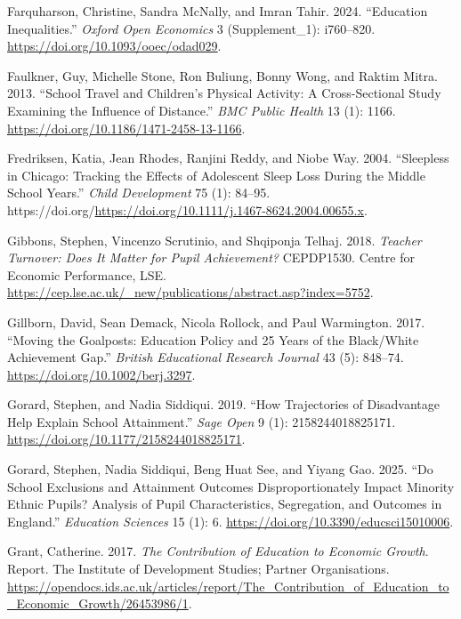 \documentclass[
  12pt,
  titlepage]{article}
\newlength{\cslhangindent}
\newenvironment{CSLReferences}[2] %
 {\begin{list}{}{%
  \setlength{\itemindent}{0pt}
  \setlength{\leftmargin}{0pt}
  \setlength{\parsep}{0pt}
  \ifodd #1
   \setlength{\leftmargin}{\cslhangindent}
   \setlength{\itemindent}{-1\cslhangindent}
  \fi
  \setlength{\itemsep}{#2\baselineskip}}}
 {\end{list}}
\begin{document}
\begin{CSLReferences}{1}{1}
Farquharson, Christine, Sandra McNally, and Imran Tahir. 2024.
{``Education Inequalities.''} \emph{Oxford Open Economics} 3
(Supplement\_1): i760--820. \url{https://doi.org/10.1093/ooec/odad029}.

Faulkner, Guy, Michelle Stone, Ron Buliung, Bonny Wong, and Raktim
Mitra. 2013. {``School Travel and Children's Physical Activity: A
Cross-Sectional Study Examining the Influence of Distance.''} \emph{BMC
Public Health} 13 (1): 1166.
\url{https://doi.org/10.1186/1471-2458-13-1166}.

Fredriksen, Katia, Jean Rhodes, Ranjini Reddy, and Niobe Way. 2004.
{``Sleepless in Chicago: Tracking the Effects of Adolescent Sleep Loss
During the Middle School Years.''} \emph{Child Development} 75 (1):
84--95.
https://doi.org/\url{https://doi.org/10.1111/j.1467-8624.2004.00655.x}.

Gibbons, Stephen, Vincenzo Scrutinio, and Shqiponja Telhaj. 2018.
\emph{Teacher Turnover: Does It Matter for Pupil Achievement?}
CEPDP1530. Centre for Economic Performance, LSE.
\url{https://cep.lse.ac.uk/_new/publications/abstract.asp?index=5752}.

Gillborn, David, Sean Demack, Nicola Rollock, and Paul Warmington. 2017.
{``Moving the Goalposts: {Education} Policy and 25 Years of the
{Black}/{White} Achievement Gap.''} \emph{British Educational Research
Journal} 43 (5): 848--74. \url{https://doi.org/10.1002/berj.3297}.

Gorard, Stephen, and Nadia Siddiqui. 2019. {``How {Trajectories} of
{Disadvantage} {Help} {Explain} {School} {Attainment}.''} \emph{Sage
Open} 9 (1): 2158244018825171.
\url{https://doi.org/10.1177/2158244018825171}.

Gorard, Stephen, Nadia Siddiqui, Beng Huat See, and Yiyang Gao. 2025.
{``Do {School} {Exclusions} and {Attainment} {Outcomes}
{Disproportionately} {Impact} {Minority} {Ethnic} {Pupils}? {Analysis}
of {Pupil} {Characteristics}, {Segregation}, and {Outcomes} in
{England}.''} \emph{Education Sciences} 15 (1): 6.
\url{https://doi.org/10.3390/educsci15010006}.

Grant, Catherine. 2017. \emph{The {Contribution} of {Education} to
{Economic} {Growth}}. Report. The Institute of Development Studies;
Partner Organisations.
\url{https://opendocs.ids.ac.uk/articles/report/The_Contribution_of_Education_to_Economic_Growth/26453986/1}.


\end{CSLReferences}
\end{document}
